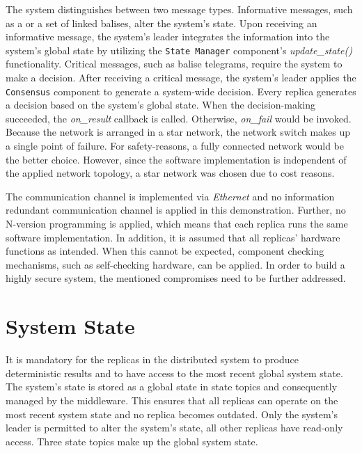 The system distinguishes between two message types.
Informative messages, such as a  or a set of linked balises, alter the system's state.
Upon receiving an informative message, the system's leader integrates the information into the system's global state by utilizing the \texttt{State Manager} component's \textit{update\_state()} functionality.
Critical messages, such as balise telegrams, require the system to make a decision.
After receiving a critical message, the system's leader applies the \texttt{Consensus} component to generate a system-wide decision.
Every replica generates a decision based on the system's global state.
When the decision-making succeeded, the \textit{on\_result} callback is called.
Otherwise, \textit{on\_fail} would be invoked.
\\

Because the network is arranged in a star network, the network switch makes up a single point of failure.
For safety-reasons, a fully connected network would be the better choice.
However, since the software implementation is independent of the applied network topology, a star network was chosen due to cost reasons.

The communication channel is implemented via \textit{Ethernet} and no information redundant communication channel is applied in this demonstration.
Further, no N-version programming is applied, which means that each replica runs the same software implementation.
In addition, it is assumed that all replicas' hardware functions as intended.
When this cannot be expected, component checking mechanisms, such as self-checking hardware, can be applied.
In order to build a highly secure system, the mentioned compromises need to be further addressed.

\section{System State}
\label{sec:stateManager}
It is mandatory for the replicas in the distributed system to produce deterministic results and to have access to the most recent global system state.
The system's state is stored as a global state in  state topics and consequently managed by the middleware.
This ensures that all replicas can operate on the most recent system state and no replica becomes outdated.
Only the system's leader is permitted to alter the system's state, all other replicas have read-only access.
Three  state topics make up the global system state.
\\

